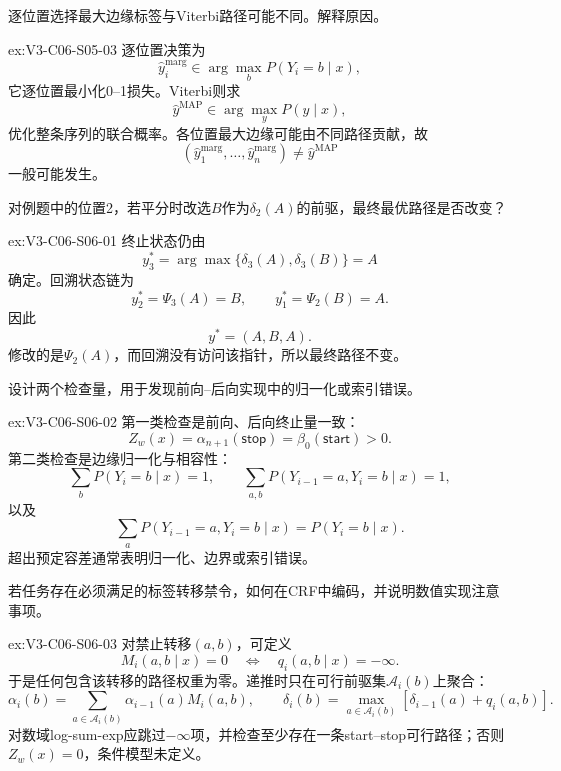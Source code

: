 \begin{SLChapterExercisePairSection}
\begin{exercise}\label{ex:V3-C06-S05-03}
逐位置选择最大边缘标签与Viterbi路径可能不同。解释原因。
\end{exercise}
\ifSLFullEdition
{}\label{sol:V3-C06-S05-03}
\begin{chapterexercisesolution}{ex:V3-C06-S05-03}
逐位置决策为
\[
\widehat y_i^{\mathrm{marg}}\in\arg\max_bP(Y_i=b\mid x),
\]
它逐位置最小化0--1损失。Viterbi则求
\[
\widehat y^{\mathrm{MAP}}\in\arg\max_yP(y\mid x),
\]
优化整条序列的联合概率。各位置最大边缘可能由不同路径贡献，故
\[
(\widehat y_1^{\mathrm{marg}},\ldots,\widehat y_n^{\mathrm{marg}})
\neq\widehat y^{\mathrm{MAP}}
\]
一般可能发生。
\end{chapterexercisesolution}
\fi

\begin{exercise}\label{ex:V3-C06-S06-01}
对例题中的位置2，若平分时改选$B$作为$\delta_2(A)$的前驱，最终最优路径是否改变？
\end{exercise}
\ifSLFullEdition
{}\label{sol:V3-C06-S06-01}
\begin{chapterexercisesolution}{ex:V3-C06-S06-01}
终止状态仍由
\[
y_3^*=\arg\max\{\delta_3(A),\delta_3(B)\}=A
\]
确定。回溯状态链为
\[
y_2^*=\Psi_3(A)=B,
\qquad
y_1^*=\Psi_2(B)=A.
\]
因此
\[
y^*=(A,B,A).
\]
修改的是$\Psi_2(A)$，而回溯没有访问该指针，所以最终路径不变。
\end{chapterexercisesolution}
\fi

\begin{exercise}\label{ex:V3-C06-S06-02}
设计两个检查量，用于发现前向--后向实现中的归一化或索引错误。
\end{exercise}
\ifSLFullEdition
{}\label{sol:V3-C06-S06-02}
\begin{chapterexercisesolution}{ex:V3-C06-S06-02}
第一类检查是前向、后向终止量一致：
\[
Z_w(x)=\alpha_{n+1}(\mathsf{stop})
=\beta_0(\mathsf{start})>0.
\]
第二类检查是边缘归一化与相容性：
\[
\sum_bP(Y_i=b\mid x)=1,
\qquad
\sum_{a,b}P(Y_{i-1}=a,Y_i=b\mid x)=1,
\]
以及
\[
\sum_aP(Y_{i-1}=a,Y_i=b\mid x)=P(Y_i=b\mid x).
\]
超出预定容差通常表明归一化、边界或索引错误。
\end{chapterexercisesolution}
\fi

\begin{exercise}\label{ex:V3-C06-S06-03}
若任务存在必须满足的标签转移禁令，如何在CRF中编码，并说明数值实现注意事项。
\end{exercise}
\ifSLFullEdition
{}\label{sol:V3-C06-S06-03}
\begin{chapterexercisesolution}{ex:V3-C06-S06-03}
对禁止转移$(a,b)$，可定义
\[
M_i(a,b\mid x)=0
\quad\Longleftrightarrow\quad
q_i(a,b\mid x)=-\infty.
\]
于是任何包含该转移的路径权重为零。递推时只在可行前驱集$\mathcal A_i(b)$上聚合：
\[
\alpha_i(b)=\sum_{a\in\mathcal A_i(b)}\alpha_{i-1}(a)M_i(a,b),
\qquad
\delta_i(b)=\max_{a\in\mathcal A_i(b)}[\delta_{i-1}(a)+q_i(a,b)].
\]
对数域log-sum-exp应跳过$-\infty$项，并检查至少存在一条start--stop可行路径；否则$Z_w(x)=0$，条件模型未定义。
\end{chapterexercisesolution}
\fi


\end{SLChapterExercisePairSection}

